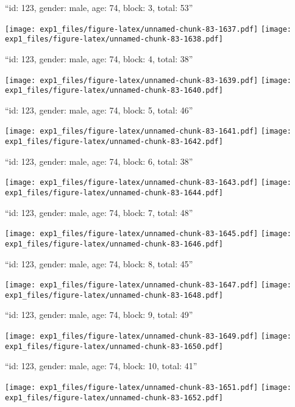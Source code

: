 \documentclass[11pt,,]{article}
\begin{document}
\newpage
[1] 

``id: 123, gender: male, age: 74, block: 3, total: 53''

\texttt{[image: exp1\_files/figure-latex/unnamed-chunk-83-1637.pdf]}
\texttt{[image: exp1\_files/figure-latex/unnamed-chunk-83-1638.pdf]}

\newpage
[1] 

``id: 123, gender: male, age: 74, block: 4, total: 38''

\texttt{[image: exp1\_files/figure-latex/unnamed-chunk-83-1639.pdf]}
\texttt{[image: exp1\_files/figure-latex/unnamed-chunk-83-1640.pdf]}

\newpage
[1] 

``id: 123, gender: male, age: 74, block: 5, total: 46''

\texttt{[image: exp1\_files/figure-latex/unnamed-chunk-83-1641.pdf]}
\texttt{[image: exp1\_files/figure-latex/unnamed-chunk-83-1642.pdf]}

\newpage
[1] 

``id: 123, gender: male, age: 74, block: 6, total: 38''

\texttt{[image: exp1\_files/figure-latex/unnamed-chunk-83-1643.pdf]}
\texttt{[image: exp1\_files/figure-latex/unnamed-chunk-83-1644.pdf]}

\newpage
[1] 

``id: 123, gender: male, age: 74, block: 7, total: 48''

\texttt{[image: exp1\_files/figure-latex/unnamed-chunk-83-1645.pdf]}
\texttt{[image: exp1\_files/figure-latex/unnamed-chunk-83-1646.pdf]}

\newpage
[1] 

``id: 123, gender: male, age: 74, block: 8, total: 45''

\texttt{[image: exp1\_files/figure-latex/unnamed-chunk-83-1647.pdf]}
\texttt{[image: exp1\_files/figure-latex/unnamed-chunk-83-1648.pdf]}

\newpage
[1] 

``id: 123, gender: male, age: 74, block: 9, total: 49''

\texttt{[image: exp1\_files/figure-latex/unnamed-chunk-83-1649.pdf]}
\texttt{[image: exp1\_files/figure-latex/unnamed-chunk-83-1650.pdf]}

\newpage
[1] 

``id: 123, gender: male, age: 74, block: 10, total: 41''

\texttt{[image: exp1\_files/figure-latex/unnamed-chunk-83-1651.pdf]}
\texttt{[image: exp1\_files/figure-latex/unnamed-chunk-83-1652.pdf]}
\end{document}
